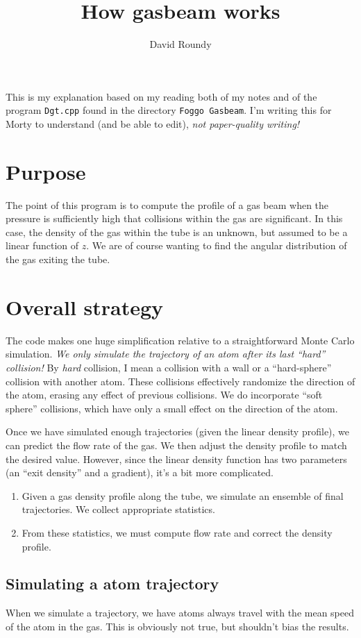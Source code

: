 \documentclass{article}
\title{How gasbeam works}
\author{David Roundy}
\begin{document}
\maketitle This is my explanation based on my reading both of my notes
and of the program \verb!Dgt.cpp! found in the directory
\verb!Foggo Gasbeam!.  I'm writing this for Morty to understand (and
be able to edit), \emph{not paper-quality writing!}

\section{Purpose}
The point of this program is to compute the profile of a gas beam when
the pressure is sufficiently high that collisions within the gas are
significant.  In this case, the density of the gas within the tube is
an unknown, but assumed to be a linear function of $z$.  We are of
course wanting to find the angular distribution of the gas exiting the
tube.


\section{Overall strategy}
The code makes one huge simplification relative to a straightforward
Monte Carlo simulation.  \emph{We only simulate the trajectory of an
  atom after its last ``hard'' collision!} By \emph{hard} collision, I
mean a collision with a wall or a ``hard-sphere'' collision with
another atom.  These collisions effectively randomize the direction of
the atom, erasing any effect of previous collisions.  We do
incorporate ``soft sphere'' collisions, which have only a small effect
on the direction of the atom.

Once we have simulated enough trajectories (given the linear density
profile), we can predict the flow rate of the gas.  We then adjust the
density profile to match the desired value.  However, since the linear
density function has two parameters (an ``exit density'' and a
gradient), it's a bit more complicated.
\begin{enumerate}
\item Given a gas density profile along the tube, we simulate an
  ensemble of final trajectories.  We collect appropriate statistics.
\item From these statistics, we must compute flow rate and correct the
  density profile.
\end{enumerate}

\subsection{Simulating a atom trajectory}
When we simulate a trajectory, we have atoms always travel with the
mean speed of the atom in the gas.  This is obviously not true, but
shouldn't bias the results.
\end{document}
